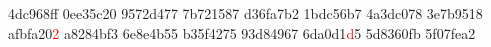 4dc968ff 0ee35c20 9572d477 7b721587
d36fa7b2 1bdc56b7 4a3dc078 3e7b9518
afbfa20\textcolor{red}{2} a8284bf3 6e8e4b55 b35f4275
93d84967 6da0d1\textcolor{red}{d}5 5d8360fb 5f07fea2
